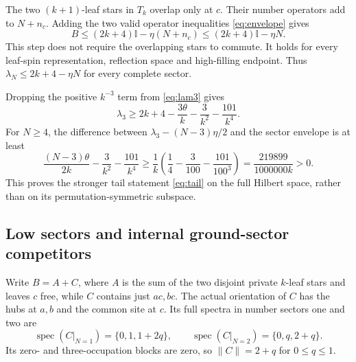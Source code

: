 \documentclass[11pt]{article}
\newcommand{\Id}{\mathbb I}
\newcommand{\norm}[1]{\lVert#1\rVert}
\begin{document}
The two $(k+1)$-leaf stars in $T_k$ overlap only at $c$.
Their number operators add to $N+n_c$. Adding the two valid operator
inequalities \eqref{eq:envelope} gives
\begin{equation}
 B\leq(2k+4)\Id-\eta(N+n_c)
   \leq(2k+4)\Id-\eta N.
 \label{eq:globalenvelope}
\end{equation}
This step does not require the overlapping stars to commute. It
holds for every leaf-spin representation, reflection space and
high-filling endpoint. Thus $\lambda_N\leq2k+4-\eta N$ for every
complete sector.

Dropping the positive $k^{-3}$ term from \eqref{eq:lam3} gives
\begin{equation}
 \lambda_3\geq2k+4-\frac{3\theta}{k}
                    -\frac3{k^2}-\frac{101}{k^4}.
 \label{eq:lam3lower}
\end{equation}
For $N\geq4$, the difference between
$\lambda_3-(N-3)\eta/2$ and the sector envelope is at least
\begin{equation}
 \frac{(N-3)\theta}{2k}-\frac3{k^2}-\frac{101}{k^4}
 \geq\frac1k\left(\frac14-\frac3{100}-\frac{101}{100^3}\right)
 =\frac{219899}{1000000k}>0.
 \label{eq:tailmargin}
\end{equation}
This proves the stronger tail statement \eqref{eq:tail} on the full
Hilbert space, rather than on its permutation-symmetric subspace.

\subsection{Low sectors and internal ground-sector competitors}

Write $B=A+C$, where $A$ is the sum of the two disjoint private
$k$-leaf stars and leaves $c$ free, while $C$ contains just $ac,bc$.
The actual orientation of $C$ has the hubs at $a,b$ and the common
site at $c$. Its full spectra in number sectors one and two are
\begin{equation}
 \operatorname{spec}(C|_{N=1})=\{0,1,1+2q\},\qquad
 \operatorname{spec}(C|_{N=2})=\{0,q,2+q\}.
 \label{eq:C}
\end{equation}
Its zero- and three-occupation blocks are zero, so $\norm C=2+q$
for $0\leq q\leq1$.
\end{document}
